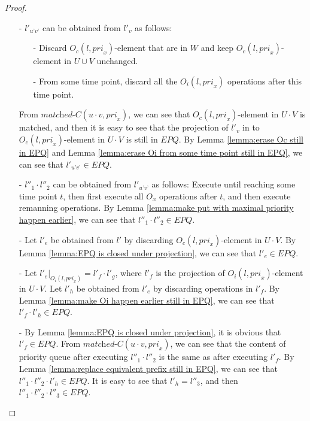 \begin {proof}
\begin{itemize}
\item[-] $l'_{\textit{u'v'}}$ can be obtained from $l'_v$ as follows:
    \begin{itemize}
    \setlength{\itemsep}{0.5pt}
    \item[-] Discard $O_c(l,\textit{pri}_x)$-element that are in $W$ and keep $O_c(l,\textit{pri}_x)$-element in $U \cup V$ unchanged.

    \item[-] From some time point, discard all the $O_i(l,\textit{pri}_x)$ operations after this time point.
    \end{itemize}

From $\textit{matched-C}(u \cdot v,\textit{pri}_x)$, we can see that $O_c(l,\textit{pri}_x)$-element in $U \cdot V$ is matched, and then it is easy to see that the projection of $l'_v$ in to $O_c(l,\textit{pri}_x)$-element in $U \cdot V$ is still in $\textit{EPQ}$. By Lemma \ref{lemma:erase Oc still in EPQ} and Lemma \ref{lemma:erase Oi from some time point still in EPQ}, we can see that $l'_{\textit{u'v'}} \in \textit{EPQ}$.

\item[-] $l''_1 \cdot l''_2$ can be obtained from $l'_{\textit{u'v'}}$ as follows: Execute until reaching some time point $t$, then first execute all $O_x$ operations after $t$, and then execute remanning operations. By Lemma \ref{lemma:make put with maximal priority happen earlier}, we can see that $l''_1 \cdot l''_2 \in \textit{EPQ}$.

\item[-] Let $l'_e$ be obtained from $l'$ by discarding $O_c(l,\textit{pri}_x)$-element in $U \cdot V$. By Lemma \ref{lemma:EPQ is closed under projection}, we can see that $l'_e \in \textit{EPQ}$.

\item[-] Let $l'_e \vert_{O_i(l,\textit{pri}_x)}  = l'_f \cdot l'_g$, where $l'_f$ is the projection of $O_i(l,\textit{pri}_x)$-element in $U \cdot V$. Let $l'_h$ be obtained from $l'_e$ by discarding operations in $l'_f$. By Lemma \ref{lemma:make Oi happen earlier still in EPQ}, we can see that $l'_f \cdot l'_h \in \textit{EPQ}$.


\item[-] By Lemma \ref{lemma:EPQ is closed under projection}, it is obvious that $l'_f \in \textit{EPQ}$. From $\textit{matched-C}(u \cdot v,\textit{pri}_x)$, we can see that the content of priority queue after executing $l''_1 \cdot l''_2$ is the same as after executing $l'_f$. By Lemma \ref{lemma:replace equivalent prefix still in EPQ}, we can see that $l''_1 \cdot l''_2 \cdot l'_h \in \textit{EPQ}$. It is easy to see that $l'_h = l''_3$, and then $l''_1 \cdot l''_2 \cdot l''_3 \in \textit{EPQ}$.


\end{itemize}
\end{proof}
